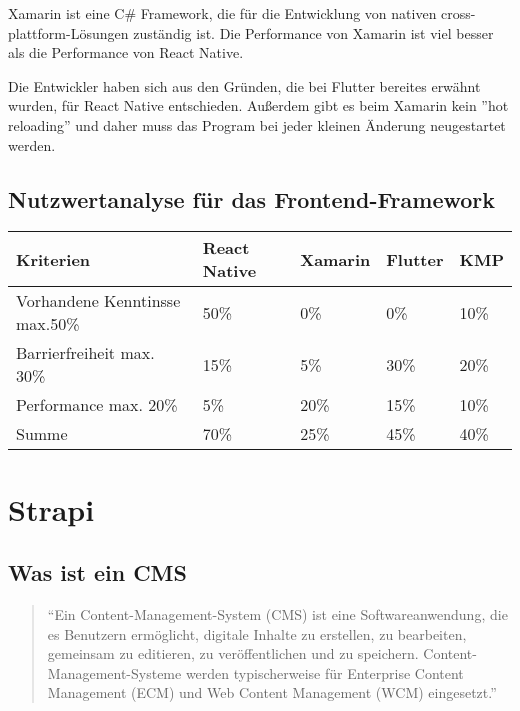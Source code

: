 \begin{spacing}{1}
    Xamarin ist eine C\# Framework, die für die Entwicklung von nativen cross-plattform-Lösungen zuständig ist.
    Die Performance von Xamarin ist viel besser als die Performance von React Native. \cite{xamarin-vs-react-native}

    Die Entwickler haben sich aus den Gründen, die bei Flutter bereites erwähnt wurden, für React Native entschieden.
    Außerdem gibt es beim Xamarin kein ''hot reloading'' und daher muss das
    Program bei jeder kleinen Änderung neugestartet werden.\cite{xamarin-vs-react-native}



    \subsection{Nutzwertanalyse für das Frontend-Framework}
    \begin{tabular}{|p{5cm} | p{2cm} | p{2cm} | p{2cm} | p{2cm} | }
        \hline
        Kriterien                      & React Native & Xamarin & Flutter & KMP  \\
        \hline
        Vorhandene Kenntinsse max.50\% & 50\%         & 0\%     & 0\%     & 10\% \\
        \hline
        Barrierfreiheit max. 30\%      & 15\%         & 5\%     & 30\%    & 20\% \\
        \hline
        Performance max. 20\%          & 5\%          & 20\%    & 15\%    & 10\% \\
        \hline
        Summe                          & 70\%         & 25\%    & 45\%    & 40\% \\
        \hline
    \end{tabular}





    \section{Strapi}

    \subsection{Was ist ein CMS}

    \begin{quotation}
        ``Ein Content-Management-System (CMS) ist eine Softwareanwendung,
        die es Benutzern ermöglicht, digitale Inhalte zu erstellen, zu bearbeiten, gemeinsam zu editieren,
        zu veröffentlichen und zu speichern. Content-Management-Systeme werden typischerweise für Enterprise
        Content Management (ECM) und Web Content Management (WCM) eingesetzt.''
        \cite{cms}
    \end{quotation}




\end{spacing}
